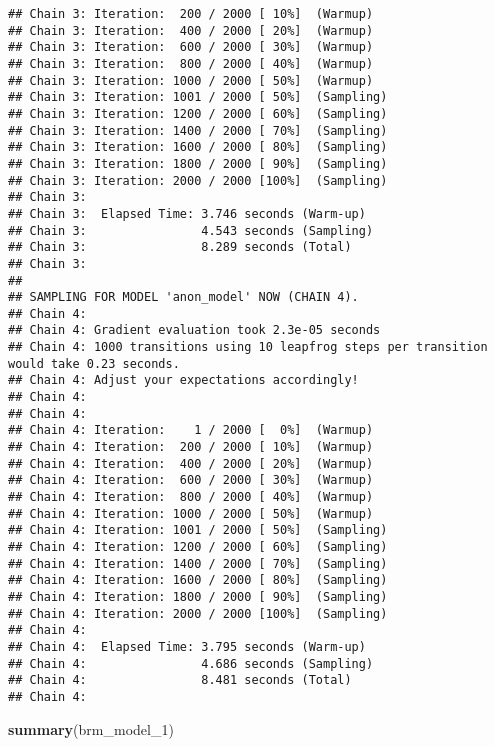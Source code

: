 \documentclass[
]{article}
\newenvironment{Shaded}{\begin{snugshade}}{\end{snugshade}}
\newcommand{\FunctionTok}[1]{\textcolor[rgb]{0.13,0.29,0.53}{\textbf{#1}}}
\newcommand{\NormalTok}[1]{#1}
\begin{document}
\begin{verbatim}
## Chain 3: Iteration:  200 / 2000 [ 10%]  (Warmup)
## Chain 3: Iteration:  400 / 2000 [ 20%]  (Warmup)
## Chain 3: Iteration:  600 / 2000 [ 30%]  (Warmup)
## Chain 3: Iteration:  800 / 2000 [ 40%]  (Warmup)
## Chain 3: Iteration: 1000 / 2000 [ 50%]  (Warmup)
## Chain 3: Iteration: 1001 / 2000 [ 50%]  (Sampling)
## Chain 3: Iteration: 1200 / 2000 [ 60%]  (Sampling)
## Chain 3: Iteration: 1400 / 2000 [ 70%]  (Sampling)
## Chain 3: Iteration: 1600 / 2000 [ 80%]  (Sampling)
## Chain 3: Iteration: 1800 / 2000 [ 90%]  (Sampling)
## Chain 3: Iteration: 2000 / 2000 [100%]  (Sampling)
## Chain 3: 
## Chain 3:  Elapsed Time: 3.746 seconds (Warm-up)
## Chain 3:                4.543 seconds (Sampling)
## Chain 3:                8.289 seconds (Total)
## Chain 3: 
## 
## SAMPLING FOR MODEL 'anon_model' NOW (CHAIN 4).
## Chain 4: 
## Chain 4: Gradient evaluation took 2.3e-05 seconds
## Chain 4: 1000 transitions using 10 leapfrog steps per transition would take 0.23 seconds.
## Chain 4: Adjust your expectations accordingly!
## Chain 4: 
## Chain 4: 
## Chain 4: Iteration:    1 / 2000 [  0%]  (Warmup)
## Chain 4: Iteration:  200 / 2000 [ 10%]  (Warmup)
## Chain 4: Iteration:  400 / 2000 [ 20%]  (Warmup)
## Chain 4: Iteration:  600 / 2000 [ 30%]  (Warmup)
## Chain 4: Iteration:  800 / 2000 [ 40%]  (Warmup)
## Chain 4: Iteration: 1000 / 2000 [ 50%]  (Warmup)
## Chain 4: Iteration: 1001 / 2000 [ 50%]  (Sampling)
## Chain 4: Iteration: 1200 / 2000 [ 60%]  (Sampling)
## Chain 4: Iteration: 1400 / 2000 [ 70%]  (Sampling)
## Chain 4: Iteration: 1600 / 2000 [ 80%]  (Sampling)
## Chain 4: Iteration: 1800 / 2000 [ 90%]  (Sampling)
## Chain 4: Iteration: 2000 / 2000 [100%]  (Sampling)
## Chain 4: 
## Chain 4:  Elapsed Time: 3.795 seconds (Warm-up)
## Chain 4:                4.686 seconds (Sampling)
## Chain 4:                8.481 seconds (Total)
## Chain 4:
\end{verbatim}

\begin{Shaded}
\begin{Highlighting}[]
\FunctionTok{summary}\NormalTok{(brm\_model\_1)}
\end{Highlighting}
\end{Shaded}
\end{document}
